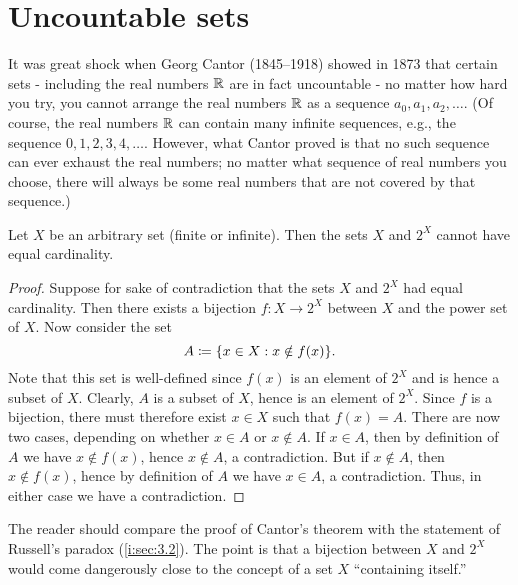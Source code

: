 \section{Uncountable sets}\label{i:sec:8.3}

\begin{note}
  It was great shock when Georg Cantor (1845--1918) showed in 1873 that certain sets
  - including the real numbers \(\mathbb{R}\) are in fact uncountable -
  no matter how hard you try, you cannot arrange the real numbers \(\mathbb{R}\) as a sequence \(a_0, a_1, a_2, \dots\).
  (Of course, the real numbers \(\mathbb{R}\) can contain many infinite sequences, e.g., the sequence \(0, 1, 2, 3, 4, \dots\).
  However, what Cantor proved is that no such sequence can ever exhaust the real numbers;
  no matter what sequence of real numbers you choose, there will always be some real numbers that are not covered by that sequence.)
\end{note}

\begin{thm}\label{i:8.3.1}
  Let \(X\) be an arbitrary set (finite or infinite).
  Then the sets \(X\) and \(2^X\) cannot have equal cardinality.
\end{thm}

\begin{proof}
  Suppose for sake of contradiction that the sets \(X\) and \(2^X\) had equal cardinality.
  Then there exists a bijection \(f : X \to 2^X\) between \(X\) and the power set of \(X\).
  Now consider the set
  \[
    A \coloneqq \set{x \in X : x \notin f(x)}.
  \]
  Note that this set is well-defined since \(f(x)\) is an element of \(2^X\) and is hence a subset of \(X\).
  Clearly, \(A\) is a subset of \(X\), hence is an element of \(2^X\).
  Since \(f\) is a bijection, there must therefore exist \(x \in X\) such that \(f(x) = A\).
  There are now two cases, depending on whether \(x \in A\) or \(x \notin A\).
  If \(x \in A\), then by definition of \(A\) we have \(x \notin f(x)\), hence \(x \notin A\), a contradiction.
  But if \(x \notin A\), then \(x \notin f(x)\), hence by definition of \(A\) we have \(x \in A\), a contradiction.
  Thus, in either case we have a contradiction.
\end{proof}

\begin{rmk}\label{i:8.3.2}
  The reader should compare the proof of Cantor's theorem with the statement of Russell's paradox (\cref{i:sec:3.2}).
  The point is that a bijection between \(X\) and \(2^X\) would come dangerously close to the concept of a set \(X\) ``containing itself.''
\end{rmk}

